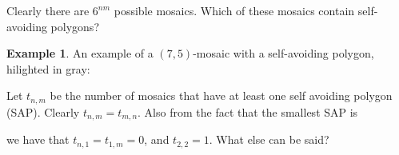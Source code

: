 \documentclass[12pt]{article}
\theoremstyle{plain}
\theoremstyle{definition}
\theoremstyle{remark}
\theoremstyle{definition}
\newtheorem{exmp}{Example}[section]
\newcommand{\cellA}[4]{ \draw[thick] ( #1 , #2 ) rectangle ( #3 , #4 ); \draw[red, thick] (#3 * 0.5 + #1 * 0.5 , #2) -- (#3, #4 * 0.5 + #2 * 0.5);}
\newcommand{\cellB}[4]{ \draw[thick] ( #1 , #2 ) rectangle ( #3 , #4 ); \draw[red, thick] (#3 * 0.5 + #1 * 0.5 , #2) -- (#1, #4 * 0.5 + #2 * 0.5);}
\newcommand{\cellC}[4]{ \draw[thick] ( #1 , #2 ) rectangle ( #3 , #4 ); \draw[red, thick] (#3 * 0.5 + #1 * 0.5 , #4) -- (#1, #4 * 0.5 + #2 * 0.5);}
\newcommand{\cellD}[4]{ \draw[thick] ( #1 , #2 ) rectangle ( #3 , #4 ); \draw[red, thick] (#3 * 0.5 + #1 * 0.5 , #4) -- (#3, #4 * 0.5 + #2 * 0.5);}
\newcommand{\cellE}[4]{ \draw[thick] ( #1 , #2 ) rectangle ( #3 , #4 ); \draw[red, thick] (#3 * 0.5 + #1 * 0.5 , #2) -- (#3 * 0.5 + #1 * 0.5 , #4);}
\newcommand{\cellF}[4]{ \draw[thick] ( #1 , #2 ) rectangle ( #3 , #4 ); \draw[red, thick] (#3, #4 * 0.5 + #2 * 0.5) -- (#1, #4 * 0.5 + #2 * 0.5);}
\newcommand{\cellAf}[4]{\filldraw[gray!40] ( #1 , #2 ) rectangle ( #3 , #4 ); \draw[thick] ( #1 , #2 ) rectangle ( #3 , #4 ); \draw[red, thick] (#3 * 0.5 + #1 * 0.5 , #2) -- (#3, #4 * 0.5 + #2 * 0.5);}
\newcommand{\cellBf}[4]{\filldraw[gray!40] ( #1 , #2 ) rectangle ( #3 , #4 ); \draw[thick] ( #1 , #2 ) rectangle ( #3 , #4 ); \draw[red, thick] (#3 * 0.5 + #1 * 0.5 , #2) -- (#1, #4 * 0.5 + #2 * 0.5);}
\newcommand{\cellCf}[4]{\filldraw[gray!40] ( #1 , #2 ) rectangle ( #3 , #4 ); \draw[thick] ( #1 , #2 ) rectangle ( #3 , #4 ); \draw[red, thick] (#3 * 0.5 + #1 * 0.5 , #4) -- (#1, #4 * 0.5 + #2 * 0.5);}
\newcommand{\cellDf}[4]{\filldraw[gray!40] ( #1 , #2 ) rectangle ( #3 , #4 ); \draw[thick] ( #1 , #2 ) rectangle ( #3 , #4 ); \draw[red, thick] (#3 * 0.5 + #1 * 0.5 , #4) -- (#3, #4 * 0.5 + #2 * 0.5);}
\newcommand{\cellEf}[4]{\filldraw[gray!40] ( #1 , #2 ) rectangle ( #3 , #4 ); \draw[thick] ( #1 , #2 ) rectangle ( #3 , #4 ); \draw[red, thick] (#3 * 0.5 + #1 * 0.5 , #2) -- (#3 * 0.5 + #1 * 0.5 , #4);}
\newcommand{\cellFf}[4]{\filldraw[gray!40] ( #1 , #2 ) rectangle ( #3 , #4 ); \draw[thick] ( #1 , #2 ) rectangle ( #3 , #4 ); \draw[red, thick] (#3, #4 * 0.5 + #2 * 0.5) -- (#1, #4 * 0.5 + #2 * 0.5);}
\begin{document}
Clearly there are $6^{nm}$ possible mosaics. Which of these mosaics contain self-avoiding polygons?

\begin{exmp}
\label{exp:sap}
An example of a $(7,5)$-mosaic with a self-avoiding polygon, hilighted in gray:
\begin{center}
\end{center}
\end{exmp}

Let $t_{n,m}$ be the number of mosaics that have at least one self avoiding polygon (SAP). Clearly $t_{n,m}=t_{m,n}.$ Also from the fact that the smallest SAP is

\begin{center}
\end{center}

we have that $t_{n,1}=t_{1,m}=0$, and $t_{2,2} = 1$. What else can be said?
\end{document}
